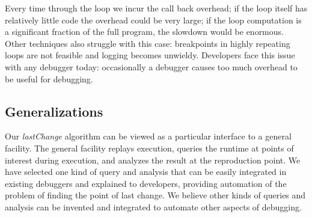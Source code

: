 \documentclass{sig-alternate}
\begin{document}
Every time through the loop we incur
the call back overhead; if the loop itself has relatively little code
the overhead could be very large; if the loop computation is a
significant fraction of the full program, the slowdown would be
enormous. 
Other techniques also struggle with this case:  breakpoints in highly repeating loops are not feasible and logging
becomes unwieldy. 
Developers face this issue with any debugger today: occasionally a
debugger causes too much overhead to be useful for debugging. 
%

\subsection{Generalizations}
Our \textit{lastChange} algorithm can be viewed as a particular interface to a general facility. 
The general facility replays execution, queries the runtime at points of interest during execution,
and analyzes the result at the reproduction point. We have selected one kind of query and analysis
that can be easily integrated in existing debuggers and explained to developers, providing automation of 
the problem of finding the point of last change. We believe other
kinds of queries and analysis can be invented and integrated to automate other aspects of debugging.
\end{document}
